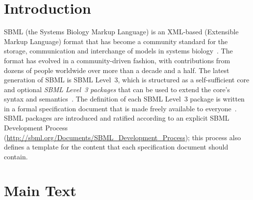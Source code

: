 \documentclass{bmcart}
\begin{document}


\section*{Introduction}

SBML (the Systems Biology Markup Language) is an XML-based (Extensible Markup Language) format that has become a community standard for the storage, communication and interchange of models in systems biology~\cite{hucka2003the, waltemath2014meeting}.  The format has evolved in a community-driven fashion, with contributions from dozens of people worldwide over more than a decade and a half.  The latest generation of SBML is SBML Level~3, which is structured as a self-sufficient core and optional \emph{SBML Level~3 packages} that can be used to extend the core's syntax and semantics~\cite{hucka2015the}.  The definition of each SBML Level~3 package is written in a formal specification document that is made freely available to everyone~\cite{schreiber2015specifications, schreiber2016specifications}.  SBML packages are introduced and ratified according to an explicit SBML Development Process (\url{http://sbml.org/Documents/SBML_Development_Process}); this process also defines a template for the content that each specification document should contain.


\section*{Main Text}
\end{document}

